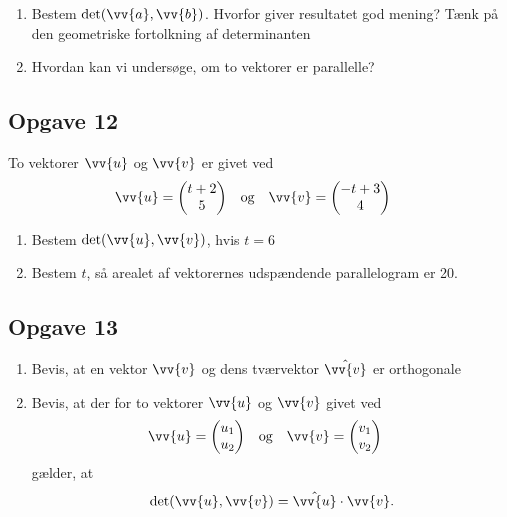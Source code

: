 \begin{enumerate}[label=\roman*)]
	\item Bestem $\det(\vv{a},\vv{b})$. Hvorfor giver resultatet god mening? Tænk på den geometriske fortolkning af determinanten
	\item Hvordan kan vi undersøge, om to vektorer er parallelle?
\end{enumerate} 


\subsection*{Opgave 12}

To vektorer $\vv{u}$ og $\vv{v}$ er givet ved
\begin{align*}
		&\vv{u} =
		\begin{pmatrix}
			t+2 \\ 5
		\end{pmatrix}
		& 
		&\textnormal{og} 
		&
		&\vv{v} =
		\begin{pmatrix}
			-t+3 \\ 4
		\end{pmatrix}
\end{align*}	
\begin{enumerate}[label=\roman*)]
	\item Bestem $\det(\vv{u},\vv{v})$, hvis $t = 6$
	\item Bestem $t$, så arealet af vektorernes udspændende parallelogram er 20.
\end{enumerate}

\subsection*{Opgave 13}
\begin{enumerate}[label=\roman*)]
	\item Bevis, at en vektor $\vv{v}$ og dens tværvektor $\hat{\vv{v}}$ er orthogonale
	\item Bevis, at der for to vektorer $\vv{u}$ og $\vv{v}$ givet ved
	\begin{align*}
		&\vv{u} =
		\begin{pmatrix}
			u_1 \\ u_2
		\end{pmatrix}
		& 
		&\textnormal{og} 
		&
		&\vv{v} =
		\begin{pmatrix}
			v_1 \\ v_2
		\end{pmatrix}
	\end{align*}
	gælder, at
	\begin{align*}
		\det(\vv{u},\vv{v}) = \hat{\vv{u}}\cdot \vv{v}.
	\end{align*}
\end{enumerate}

